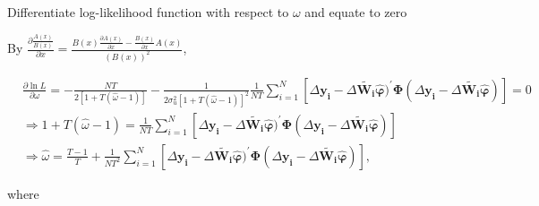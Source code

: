 \documentclass[12pt,a4paper,hyperref]{article}
\begin{document}
Differentiate log-likelihood function with respect to $\omega$ and equate to zero

By   $\frac{\partial \frac{A(x)}{B(x)}}{\partial x}= \frac{B(x)\frac{\partial A(x)}{\partial x}-\frac{B(x)}{\partial x}A(x)}{(B(x))^{2}}$,


\begin{align*}
&\frac{\partial \ln L}{\partial \omega}=-\frac{NT}{2[1+T(\hat{\omega}-1)]}-\frac{1}{2 \sigma^{2}_{u}[1+T(\hat{\omega}-1)]^{2}}
\frac{1}{NT} \sum_{i=1}^{N}[\Delta \boldsymbol{y_{i}}-\Delta \boldsymbol{\tilde{W_{i}}} \boldsymbol{\hat{\varphi}})^{'}  \boldsymbol{\Phi} (\Delta \boldsymbol{y_{i}}-\Delta \boldsymbol{\tilde{W_{i}}} \boldsymbol{\hat{\varphi}})]=0 \\
&\Rightarrow 1+T(\hat{\omega}-1)=\frac{1}{NT} \sum_{i=1}^{N}[\Delta \boldsymbol{y_{i}}-\Delta \boldsymbol{\tilde{W_{i}}} \boldsymbol{\hat{\varphi}})^{'}  \boldsymbol{\Phi} (\Delta \boldsymbol{y_{i}}-\Delta \boldsymbol{\tilde{W_{i}}} \boldsymbol{\hat{\varphi}})] \\
&\Rightarrow \hat{\omega}=\frac{T-1}{T} + \frac{1}{NT^{2}} \sum_{i=1}^{N}[\Delta \boldsymbol{y_{i}}-\Delta \boldsymbol{\tilde{W_{i}}} \boldsymbol{\hat{\varphi}})^{'}  \boldsymbol{\Phi} (\Delta \boldsymbol{y_{i}}-\Delta \boldsymbol{\tilde{W_{i}}} \boldsymbol{\hat{\varphi}})],
\end{align*}




where \\
\end{document}
